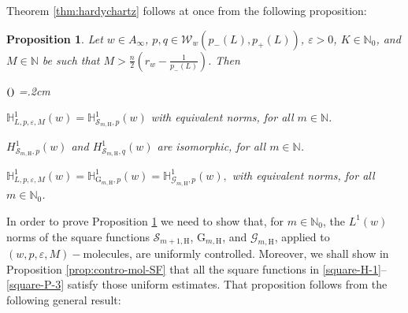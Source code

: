 \documentclass[11pt, a4paper,leqno]{amsart}
\theoremstyle{plain}
\newtheorem{proposition}[equation]{Proposition}
\theoremstyle{definition}
\theoremstyle{remark}
\numberwithin{equation}{section}
\def \N{ \mathbb{N} }
\def \Scal{ \mathcal{S} }
\def \hh{ \mathrm{H} }
\def \Gcal { \mathcal{G} }
\def \Grm{ \mathrm{G} }
\def \mol{ (w,p,\varepsilon,M)-\textrm{molecule}}
\begin{document}
Theorem \ref{thm:hardychartz} follows at once from the following proposition:



\begin{proposition}\label{lema:SH-1}
Let $w\in A_{\infty}$, $p,q\in \mathcal{W}_w(p_-(L),p_+(L))$,  $\varepsilon>0$, $K\in \N_0$, and $M\in \N$ be
 such that $M>\frac{n}{2}\left(r_w-\frac{1}{p_-(L)}\right)$. Then
\begin{list}{$(\theenumi)$}{\leftmargin=1cm \itemsep=0.2cm\topsep=.2cm \renewcommand{\theenumi}{\alph{enumi}}}


\item 
$
\mathbb{H}^1_{L,p,\varepsilon,M}(w)=\mathbb{H}^1_{\Scal_{m,\hh},p}(w)
$
with equivalent norms, for all $m\in \N$.

\item 
$
H^1_{\Scal_{m,\hh},p}(w)$ and $H_{\Scal_{m,\hh},q}^1(w)
$ are isomorphic, for all $m\in \N$.


\item  
 $
\mathbb{H}_{L,p,\varepsilon,M}^1(w)= \mathbb{H}_{\Grm_{m,\hh},p}^1(w)= \mathbb{H}_{\Gcal_{m,\hh},p}^1(w),
$  with equivalent norms, for all $m\in \N_{0}$.
\end{list}

\end{proposition}




In order to prove Proposition \ref{lema:SH-1} we need to show that, for $m\in \N_0$, the $L^1(w)$ norms of the square functions $\Scal_{m+1,\hh}$, $\Grm_{m,\hh}$, and  $\Gcal_{m,\hh}$, applied to $\mol$s, are uniformly controlled. Moreover, we shall show in Proposition \ref{prop:contro-mol-SF}  that all the square functions in \eqref{square-H-1}--\eqref{square-P-3} satisfy those uniform estimates. That proposition follows from the following general result:
\end{document}
